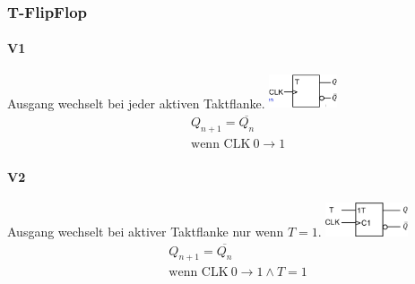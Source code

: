 \subsubsection{T-FlipFlop}
\begin{center}
    \begin{minipage}[t]{0.45\linewidth}
        \paragraph{V1} Ausgang wechselt bei jeder aktiven Taktflanke.
        \includegraphics[height = 10mm]{images/t_ff_1.jpeg}
        \begin{align*}
            &Q_{n + 1} = \overline{Q_n}\\
            &\text{wenn CLK}~0\rightarrow 1 
        \end{align*}
    \end{minipage}
    \hfill
    \begin{minipage}[t]{0.45\linewidth}
        \paragraph{V2} Ausgang wechselt bei aktiver Taktflanke nur wenn \emph{$T = 1$}.
        \includegraphics[height = 10mm]{images/t_ff_2.jpeg}
        \begin{align*}
            &Q_{n + 1} = \overline{Q_n}\\
            &\text{wenn CLK}~0\rightarrow 1 \land T = 1
        \end{align*}
    \end{minipage}
\end{center}
